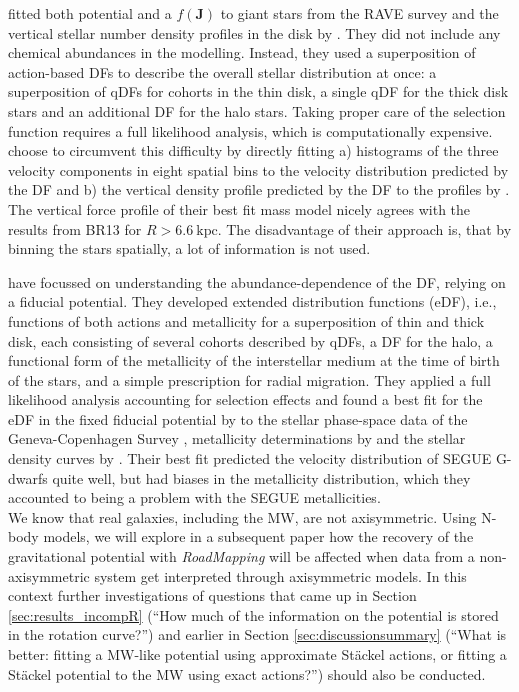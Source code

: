 \documentclass[iop,revtex4]{emulateapj}
\newcommand{\vect}[1]{\boldsymbol{#1}}
\newcommand{\RM}{{\sl RoadMapping}}
\begin{document}
\citet{2014MNRAS.445.3133P} fitted both potential and a $f(\vect{J})$ to giant stars from the RAVE survey \citep{2006AJ....132.1645S} and the vertical stellar number density profiles in the disk by \citet{2008ApJ...673..864J}. They did not include any chemical abundances in the modelling. Instead, they used a superposition of action-based DFs to describe the overall stellar distribution at once: a superposition of qDFs for cohorts in the thin disk, a single qDF for the thick disk stars and an additional DF for the halo stars. Taking proper care of the selection function requires a full likelihood analysis, which is computationally expensive. \citet{2014MNRAS.445.3133P} choose to circumvent this difficulty by directly fitting a) histograms of the three velocity components in eight spatial bins to the velocity distribution predicted by the DF and b) the vertical density profile predicted by the DF to the profiles by \citet{2008ApJ...673..864J}. The vertical force profile of their best fit mass model nicely agrees with the results from BR13 for $R>6.6~\text{kpc}$. The disadvantage of their approach is, that by binning the stars spatially, a lot of information is not used.

\citet{2015MNRAS.449.3479S} have focussed on understanding the abundance-dependence of the DF, relying on a fiducial potential. They developed extended distribution functions (eDF), i.e., functions of both actions and metallicity for a superposition of thin and thick disk, each consisting of several cohorts described by qDFs, a DF for the halo, a functional form of the metallicity of the interstellar medium at the time of birth of the stars, and a simple prescription for radial migration. They applied a full likelihood analysis accounting for selection effects and found a best fit for the eDF in the fixed fiducial potential by \citet{1998MNRAS.294..429D} to the stellar phase-space data of the Geneva-Copenhagen Survey \citep{2004A&A...418..989N,2009A&A...501..941H}, metallicity determinations by \citet{2011A&A...530A.138C} and the stellar density curves by \citet{1983MNRAS.202.1025G}. Their best fit predicted the velocity distribution of SEGUE G-dwarfs \citep{2014ApJS..211...17A} quite well, but had biases in the metallicity distribution, which they accounted to being a problem with the SEGUE metallicities. \\

 We know that real galaxies, including the MW, are not axisymmetric. Using N-body models, we will explore in a subsequent paper how the recovery of the gravitational potential with \RM{} will be affected when data from a non-axisymmetric system get interpreted through axisymmetric models. In this context further investigations of questions that came up in Section \ref{sec:results_incompR} (``How much of the information on the potential is stored in the rotation curve?'') and earlier in Section \ref{sec:discussionsummary} (``What is better: fitting a MW-like potential using approximate St\"ackel actions, or fitting a St\"ackel potential to the MW using exact actions?'') should also be conducted.
\end{document}

